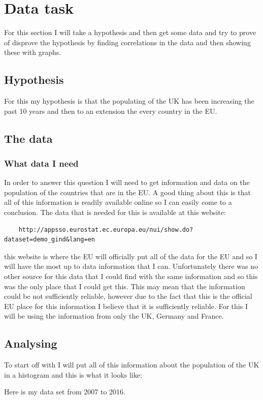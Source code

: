 \documentclass{article}
\begin{document}
\section{Data task}
For this section I will take a hypothesis and then get some data and try to prove of disprove the hypothesis by finding correlations in the data and then showing these with graphs.  

\subsection{Hypothesis}
For this my hypothesis is that the populating of the UK has been increasing the past 10 years and then to an extension the every country in the EU. 
\subsection{The data}
\subsubsection{What data I need}
In order to answer this question I will need to get information and data on the population of the countries that are in the EU. A good thing about this is that all of this information is readily available online so I can easily come to a conclusion. The data that is needed for this is available at this website:
\begin{verbatim}
	http://appsso.eurostat.ec.europa.eu/nui/show.do?dataset=demo_gind&lang=en
\end{verbatim}
this website is where the EU will officially put all of the data for the EU and so I will have the most up to data information that I can. Unfortunately there was no other source for this data that I could find with the same information and so this was the only place that I could get this. This may mean that the information could be not sufficiently reliable, however due to the fact that this is the official EU place for this information I believe that it is sufficiently reliable. For this I will be using the information from only the UK, Germany and France. 
\subsection{Analysing}
To start off with I will put all of this information about the population of the UK in a histogram and this is what it looks like:

Here is my data set from 2007 to 2016. 
\end{document}
